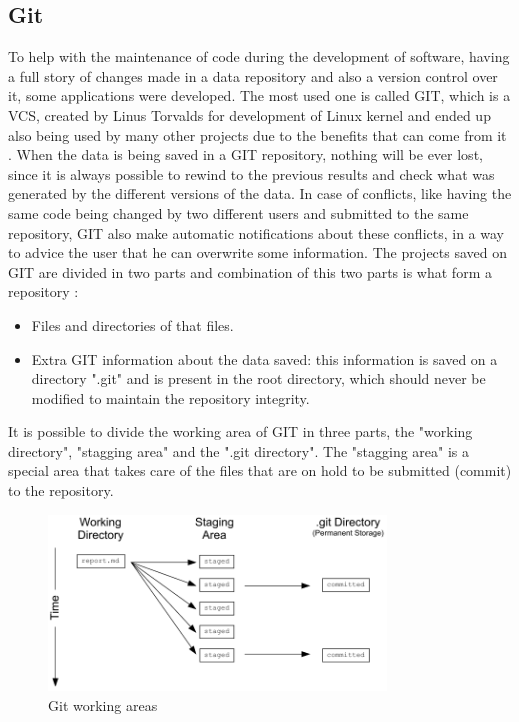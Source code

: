 \documentclass[mim_thesis.tex]{subfiles}
\begin{document}
\subsection{Git}
To help with the maintenance of code during the development of software, having a full story of changes made in a data repository and also a version control over it, some applications were developed. The most used one is called GIT, which is a \ac{VCS}, created by Linus Torvalds for development of Linux kernel and ended up also being used by many other projects due to the benefits that can come from it \citep{chacon2014pro}. When the data is being saved in a GIT repository, nothing will be ever lost, since it is always possible to rewind to the previous results and check what was generated by the different versions of the data. In case of conflicts, like having the same code being changed by two different users and submitted to the same repository, GIT also make automatic notifications about these conflicts, in a way to advice the user that he can overwrite some information. The projects saved on GIT are divided in two parts and combination of this two parts is what form a repository \citep{datacamp2017}:

\begin{itemize} [noitemsep]
\item Files and directories of that files.
\item Extra GIT information about the data saved: this information is saved on a directory ".git" and is present in the root directory, which should never be modified to maintain the repository integrity.
\end{itemize}

It is possible to divide the working area of GIT in three parts, the "working directory", "stagging area" and the ".git directory". The "stagging area" is a special area that takes care of the files that are on hold to be submitted (commit) to the repository.

\begin{figure}[H]
	\centering
    \includegraphics[width=0.8\textwidth]{img/git_areas.PNG}
	\caption{Git working areas \citep{datacamp2017}}
	\label{fig:git_areas}
\end{figure}
\end{document}
